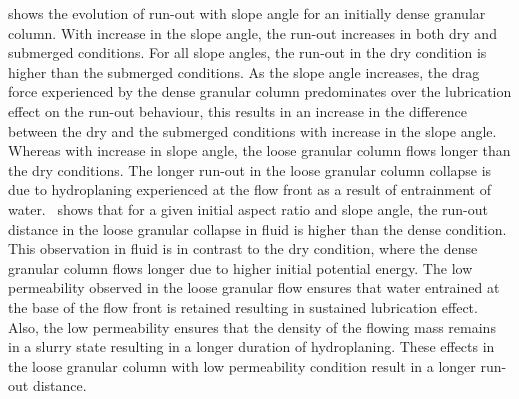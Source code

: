  shows the evolution of run-out with slope angle 
for an initially dense granular column. With increase in the slope angle, the 
run-out increases in both dry and submerged conditions. For all slope angles, 
the run-out in the dry condition is higher than the submerged conditions. As 
the slope angle increases, the drag force experienced by the dense granular 
column predominates over the lubrication effect on the run-out behaviour, this 
results in an increase in the difference between the dry and the submerged 
conditions with increase in the slope angle. Whereas with increase in slope 
angle, the loose granular column flows longer than the dry conditions. The 
longer run-out in the loose granular column collapse is due to hydroplaning 
experienced at the flow front as a result of entrainment of 
water.~ shows that for a 
given initial aspect ratio and slope angle, the run-out distance in the loose 
granular collapse in fluid is higher than the dense condition. This observation 
in fluid is in contrast to the dry condition, where the dense granular column 
flows longer due to higher initial potential energy. The low permeability 
observed in the loose granular flow ensures that water entrained at the base of 
the flow front is retained resulting in sustained lubrication effect. Also, the 
low permeability ensures that the density of the flowing mass remains in a 
slurry state resulting in a longer duration of hydroplaning. These effects in 
the loose granular column with low permeability condition result in a longer 
run-out distance. 

